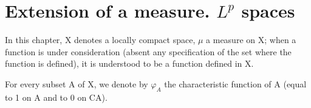 \chapter{\texorpdfstring{Extension of a measure. \(L^{p}\) spaces}{Extension of a measure. L to the p spaces}}

In this chapter, X denotes a locally compact space, \(\mu\) a measure on X; when a function is under consideration (absent any specification of the set where the function is defined), it is understood to be a function defined in X.

For every subset A of X, we denote by \(\varphi_{A}\) the characteristic function of A (equal to 1 on A and to 0 on CA).

